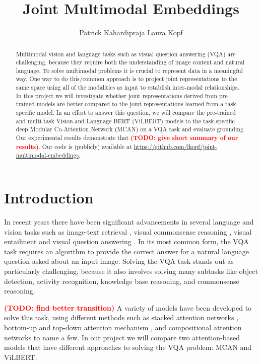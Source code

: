 \documentclass{article}
\title{Joint Multimodal Embeddings}
\author{%
   Patrick Kahardipraja%
  \And
   Laura Kopf \\
}
\newcommand{\todo}[1]{\textbf{\textcolor{Red}{(TODO: #1)}}}
\begin{document}
\maketitle

\begin{abstract}
Multimodal vision and language tasks such as visual question answering (VQA) are challenging, because they require both the understanding of image content and natural language. To solve multimodal problems it is crucial to represent data in a meaningful way. One way to do this/common approach is to project joint representations to the same space using all of the modalities as input to establish inter-modal relationships. In this project we will investigate whether joint representations derived from pre-trained models are better compared to the joint representations learned from a task-specific model. In an effort to answer this question, we will compare the pre-trained and multi-task Vision-and-Language BERT (ViLBERT) \citep{lu2019vilbert, lu2020multitask} models to the task-specific deep Modular Co-Attention Network (MCAN) \citep{yu2019mcan} on a VQA task and evaluate grounding. Our experimental results demonstrate that \todo{give short summary of our results}. Our code is (publicly) available at \url{https://github.com/lkopf/joint-multimodal-embeddings}.
\end{abstract}

\section{Introduction}

In recent years there have been significant advancements in several language and vision tasks such as image-text retrieval \citep{wang2016retrieval}, visual commonsense reasoning \citep{zellers2019vcr}, visual entailment \citep{xie2019entailment} and visual question answering \citep{antol2015vqa, malinowski2014vqa, ban, zhao2018vqa}. In its most common form, the VQA task requires an algorithm to provide the correct answer for a natural language question asked about an input image. Solving the VQA task stands out as particularly challenging, because it also involves solving many subtasks like object detection, activity recognition, knowledge base reasoning, and commonsense reasoning. 

\todo{find better transition}
A variety of models have been developed to solve this task, using different methods such as stacked attention networks \citep{yang2016vqa}, bottom-up and top-down attention mechanism \citep{Anderson_2018_CVPR}, and compositional attention networks \citep{hudson2018mac} to name a few. In our project we will compare two attention-based models that have different approaches to solving the VQA problem: MCAN and ViLBERT.
\end{document}
